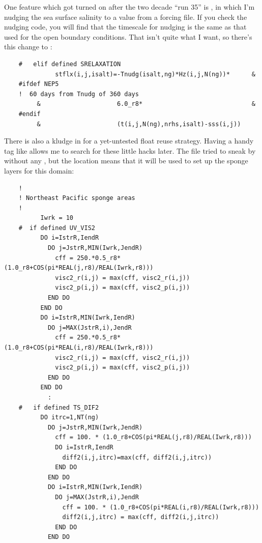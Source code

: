 One feature which got turned on after the two decade ``run 35'' is
, in which I'm nudging the sea surface salinity to
a value from a forcing file. If you check the nudging code, you will
find that the timescale for nudging is the same as that used for the
open boundary conditions. That isn't quite what I want, so there's
this change to :
\begin{verbatim}
    #   elif defined SRELAXATION
              stflx(i,j,isalt)=-Tnudg(isalt,ng)*Hz(i,j,N(ng))*      &
    #ifdef NEP5   
    !  60 days from Tnudg of 360 days
         &                     6.0_r8*                              &
    #endif
         &                     (t(i,j,N(ng),nrhs,isalt)-sss(i,j))
\end{verbatim}
There is also a kludge in  for a yet-untested
float reuse strategy. Having a handy tag like  allows me
to search for these little hacks later. The file
 tried to sneak by without any
, but the location means that it will be used to set up
the sponge layers for this domain:
\begin{verbatim}
    !
    ! Northeast Pacific sponge areas
    !
          Iwrk = 10
    #  if defined UV_VIS2
          DO i=IstrR,IendR
            DO j=JstrR,MIN(Iwrk,JendR)
              cff = 250.*0.5_r8*(1.0_r8+COS(pi*REAL(j,r8)/REAL(Iwrk,r8)))
              visc2_r(i,j) = max(cff, visc2_r(i,j))
              visc2_p(i,j) = max(cff, visc2_p(i,j))
            END DO
          END DO
          DO i=IstrR,MIN(Iwrk,IendR)
            DO j=MAX(JstrR,i),JendR
              cff = 250.*0.5_r8*(1.0_r8+COS(pi*REAL(i,r8)/REAL(Iwrk,r8)))
              visc2_r(i,j) = max(cff, visc2_r(i,j))
              visc2_p(i,j) = max(cff, visc2_p(i,j))
            END DO
          END DO
            :
    #   if defined TS_DIF2
          DO itrc=1,NT(ng)
            DO j=JstrR,MIN(Iwrk,JendR)
              cff = 100. * (1.0_r8+COS(pi*REAL(j,r8)/REAL(Iwrk,r8)))
              DO i=IstrR,IendR
                diff2(i,j,itrc)=max(cff, diff2(i,j,itrc))
              END DO
            END DO
            DO i=IstrR,MIN(Iwrk,IendR)
              DO j=MAX(JstrR,i),JendR
                cff = 100. * (1.0_r8+COS(pi*REAL(i,r8)/REAL(Iwrk,r8)))
                diff2(i,j,itrc) = max(cff, diff2(i,j,itrc))
              END DO
            END DO
\end{verbatim}

